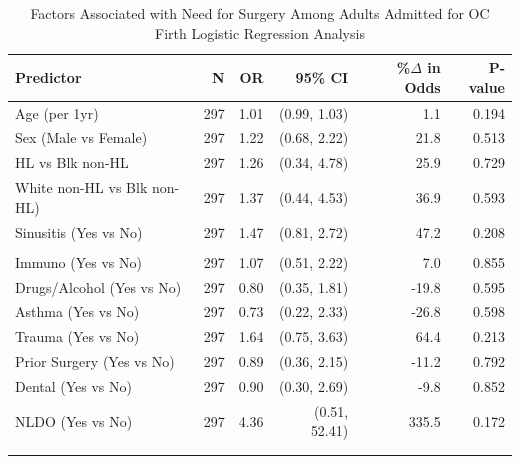 \documentclass[
]{article}
\begin{document}
\begin{table}[t]
\caption*{
{\fontsize{20}{25}\selectfont  Factors Associated with Need for Surgery Among Adults Admitted for OC\small } \\ 
{\fontsize{14}{17}\selectfont  Firth Logistic Regression Analysis\small }
} 
\begin{tabular*}{0.85\linewidth}{@{\extracolsep{\fill}}lrrrrr}
\toprule
{\bfseries Predictor} & N & {\bfseries OR} & 95\% CI & \%\ensuremath{\Delta} in Odds & P-value \\ 
\midrule\addlinespace[2.5pt]
Age (per 1yr) & 297 & 1.01 & (0.99, 1.03) & 1.1 & 0.194 \\ 
Sex (Male vs Female) & 297 & 1.22 & (0.68, 2.22) & 21.8 & 0.513 \\ 
HL vs Blk non-HL & 297 & 1.26 & (0.34, 4.78) & 25.9 & 0.729 \\ 
White non-HL vs Blk non-HL) & 297 & 1.37 & (0.44, 4.53) & 36.9 & 0.593 \\ 
Sinusitis (Yes vs No) & 297 & 1.47 & (0.81, 2.72) & 47.2 & 0.208 \\ 
{\cellcolor[HTML]{FFF3CD}{Diabetes (Yes vs No)}} & {\cellcolor[HTML]{FFF3CD}{297}} & {\cellcolor[HTML]{FFF3CD}{2.97}} & {\cellcolor[HTML]{FFF3CD}{(1.46, 6.21)}} & {\cellcolor[HTML]{FFF3CD}{196.9}} & {\cellcolor[HTML]{FFF3CD}{0.002}} \\ 
Immuno (Yes vs No) & 297 & 1.07 & (0.51, 2.22) & 7.0 & 0.855 \\ 
Drugs/Alcohol (Yes vs No) & 297 & 0.80 & (0.35, 1.81) & -19.8 & 0.595 \\ 
Asthma (Yes vs No) & 297 & 0.73 & (0.22, 2.33) & -26.8 & 0.598 \\ 
Trauma (Yes vs No) & 297 & 1.64 & (0.75, 3.63) & 64.4 & 0.213 \\ 
Prior Surgery (Yes vs No) & 297 & 0.89 & (0.36, 2.15) & -11.2 & 0.792 \\ 
Dental (Yes vs No) & 297 & 0.90 & (0.30, 2.69) & -9.8 & 0.852 \\ 
NLDO (Yes vs No) & 297 & 4.36 & (0.51, 52.41) & 335.5 & 0.172 \\ 
{\cellcolor[HTML]{FFF3CD}{SPA (Yes vs No)}} & {\cellcolor[HTML]{FFF3CD}{297}} & {\cellcolor[HTML]{FFF3CD}{38.44}} & {\cellcolor[HTML]{FFF3CD}{(12.10, 194.21)}} & {\cellcolor[HTML]{FFF3CD}{3,744.5}} & {\cellcolor[HTML]{FFF3CD}{<0.001}} \\ 
{\cellcolor[HTML]{FFF3CD}{OA (Yes vs No)}} & {\cellcolor[HTML]{FFF3CD}{297}} & {\cellcolor[HTML]{FFF3CD}{6.35}} & {\cellcolor[HTML]{FFF3CD}{(2.96, 14.71)}} & {\cellcolor[HTML]{FFF3CD}{534.5}} & {\cellcolor[HTML]{FFF3CD}{<0.001}} \\ 

\end{tabular*}
\end{table}
\end{document}
